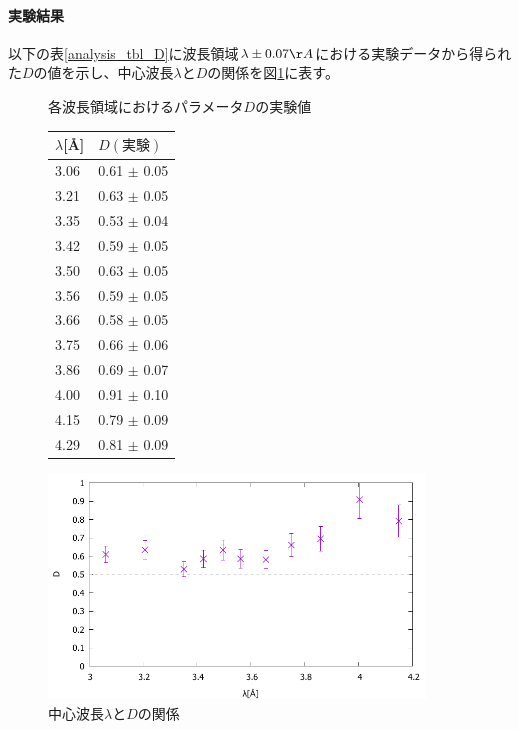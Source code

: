 \paragraph{実験結果}
以下の表\ref{analysis_tbl_D}に波長領域$\lambda \pm 0.07 \AA$における実験データから得られた$D$の値を示し、中心波長$\lambda$と$D$の関係を図\ref{analysis_fig_D}に表す。
\begin{figure}[H]
\begin{minipage}{0.35\hsize}
\centering
\makeatletter
\def\@captype{table}
\makeatother
\caption{各波長領域におけるパラメータ$D$の実験値} \label{analysis_tbl_D}
\begin{tabular}{ll}
$\lambda$[\AA] &  $D(実験)$\\ \hline
3.06 	&	0.61 	$\pm$	0.05 	\\
3.21 	&	0.63 	$\pm$	0.05 	\\
3.35 	&	0.53 	$\pm$	0.04 	\\
3.42 	&	0.59 	$\pm$	0.05 	\\
3.50 	&	0.63 	$\pm$	0.05 	\\
3.56 	&	0.59 	$\pm$	0.05 	\\
3.66 	&	0.58 	$\pm$	0.05 	\\
3.75 	&	0.66 	$\pm$	0.06 	\\
3.86 	&	0.69 	$\pm$	0.07 	\\
4.00 	&	0.91 	$\pm$	0.10 	\\
4.15 	&	0.79 	$\pm$	0.09 	\\
4.29 	&	0.81 	$\pm$	0.09 	\\ \hline
\end{tabular}
\end{minipage}
\begin{minipage}{0.65\hsize}
\centering
\vspace{2.5cm}
\includegraphics[width=10cm]{analysis/D/D_F.pdf}
\caption{中心波長$\lambda$と$D$の関係} \label{analysis_fig_D}
\end{minipage}
\end{figure}

